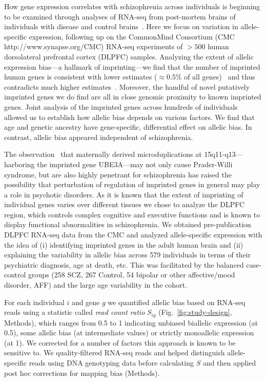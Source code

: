 \documentclass[letterpaper]{article}
\begin{document}
How gene expression correlates with schizophrenia across individuals is
beginning to be examined through analyses of RNA-seq from post-mortem brains
of individuals with disease and control brains~\cite{Fromer2016a}.  Here we
focus on variation in allele-specific expression, following up on the
CommonMind Consortium (CMC http://www.synapse.org/CMC) RNA-seq experiments of
\(>500\) human dorsolateral prefrontal cortex (DLPFC) samples.  Analyzing the
extent of allelic expression bias---a hallmark of imprinting---we find that
the number of imprinted human genes is consistent with lower estimates
(\(\approx 0.5 \%\) of all
genes)~\cite{Andergassen2017,Babak2015,Baran2015,DeVeale2012,Perez2015} and
thus contradicts much higher estimates~\cite{Gregg2010a}. Moreover, the handful of
novel putatively imprinted genes we do find are all in close genomic proximity
to known imprinted genes.  Joint analysis of the imprinted genes across
hundreds of individuals allowed us to establish how allelic bias depends on
various factors.  We find that age and genetic ancestry have gene-specific,
differential effect on allelic bias.  In contrast, allelic bias appeared
independent of schizophrenia.  

The observation~\cite{Noor2015,Rees2014} that maternally derived
microduplications at 15q11-q13---harboring the imprinted gene UBE3A---may not
only cause Prader-Willi syndrome, but are also highly penetrant for
schizophrenia has raised the possibility that perturbation of regulation of
imprinted genes in general may play a role in psychotic disorders.  As it is
known that the extent of imprinting of individual genes varies over different
tissues we chose to analyze the DLPFC region, which controls complex cognitive and
executive functions and is known to display functional abnormalities in
schizophrenia.  We obtained pre-publication DLPFC RNA-seq data from the CMC
and analyzed allele-specific expression with the idea of (i) identifying
imprinted genes in the adult human brain and (ii) explaining the
variability in allelic bias across 579 individuals in terms of their
psychiatric diagnosis, age at death, etc.  This was facilitated by the
balanced case-control groups (258 SCZ, 267 Control, 54 bipolar or other
affective/mood disorder, AFF) and the large age variability in the cohort.

For each individual \(i\) and gene \(g\) we quantified allelic bias based on
RNA-seq reads using a statistic called \emph{read count ratio} \(S_{ig}\)
(Fig.~\ref{fig:study-design}, Methods), which ranges from 0.5 to 1 indicating unbiased
biallelic expression (at 0.5), some allelic bias (at intermediate values) or
strictly monoallelic expression (at 1).  We corrected for a number
of factors this approach is known to be sensitive to.  We quality-filtered
RNA-seq reads and helped distinguish allele-specific reads using DNA
genotyping data before calculating \(S\) and then applied post hoc corrections
for mapping bias (Methods).
\end{document}
